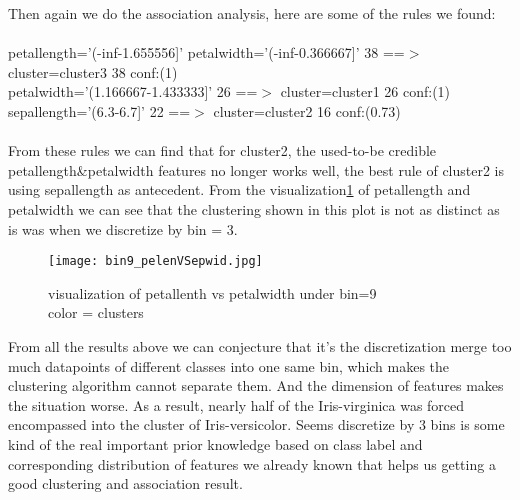 \documentclass{article}
\begin{document}
Then again we do the association analysis, here are some of the rules we found:\\
\\
petallength='(-inf-1.655556]' petalwidth='(-inf-0.366667]' 38 ==$>$ cluster=cluster3 38    conf:(1)\\
petalwidth='(1.166667-1.433333]' 26 ==$>$ cluster=cluster1 26    conf:(1)\\
sepallength='(6.3-6.7]' 22 ==$>$ cluster=cluster2 16    conf:(0.73)\\
\\

From these rules we can find that for cluster2, the used-to-be credible petallength\&petalwidth features no longer works well, the best rule of cluster2 is using sepallength as antecedent. From the visualization\ref{fig:bin9_pelenVSepwid} of petallength and petalwidth we can see that the clustering shown in this plot is not as distinct as is was when we discretize by bin = 3.

\begin{figure}[H]
\centering
\texttt{[image: bin9\_pelenVSepwid.jpg]}
\caption{\label{fig:bin9_pelenVSepwid}visualization of petallenth vs petalwidth under bin=9\\color = clusters}
\end{figure}

From all the results above we can conjecture that it’s the discretization merge too much datapoints of different classes into one same bin, which makes the clustering algorithm cannot separate them. And the dimension of features makes the situation worse. As a result, nearly half of the Iris-virginica was forced encompassed into the cluster of Iris-versicolor. Seems discretize by 3 bins is some kind of the real important prior knowledge based on class label and corresponding distribution of features we already known that helps us getting a good clustering and association result.
\end{document}
